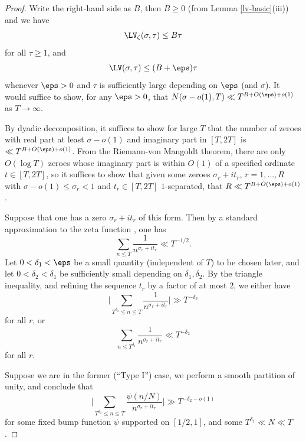 \begin{proof}
Write the right-hand side as $B$, then $B \geq 0$ (from Lemma \ref{lv-basic}(iii)) and we have
\begin{equation}\label{lvz-bound}
    \LV_\zeta(\sigma,\tau) \leq B \tau
\end{equation}
for all $\tau \geq 1$, and
\begin{equation}\label{lv-bound}
    \LV(\sigma,\tau) \leq (B+\eps) \tau
\end{equation}
whenever $\eps>0$ and $\tau$ is sufficiently large depending on $\eps$ (and $\sigma$).  It would suffice to show, for any $\eps>0$, that $N(\sigma-o(1),T) \ll T^{B+O(\eps)+o(1)}$ as $T \to \infty$.

By dyadic decomposition, it suffices to show for large $T$ that the number of zeroes with real part at least $\sigma-o(1)$ and imaginary part in  $[T,2T]$ is $\ll T^{B+O(\eps)+o(1)}$.  From the Riemann-von Mangoldt theorem, there are only $O(\log T)$ zeroes whose imaginary part is within $O(1)$ of a specified ordinate $t \in [T,2T]$, so it suffices to show that given some zeroes $\sigma_r + i t_r$, $r=1,\dots,R$ with $\sigma-o(1) \leq \sigma_r < 1$ and $t_r \in [T,2T]$ $1$-separated, that $R \ll T^{B+O(\eps)+o(1)}$.

Suppose that one has a zero $\sigma_r+i t_r$ of this form.  Then by a standard approximation to the zeta function \cite[Theorem 1.8]{ivic}, one has
$$ \sum_{n \leq T} \frac{1}{n^{\sigma_r+it_r}} \ll T^{-1/2}.$$
Let $0 < \delta_1 < \eps$ be a small quantity (independent of $T$) to be chosen later, and let $0 < \delta_2 < \delta_1$ be sufficiently small depending on $\delta_1,\delta_2$.  By the triangle inequality, and refining the sequence $t_r$ by a factor of at most $2$, we either have
$$ \bigg|\sum_{T^{\delta_1} \leq n \leq T} \frac{1}{n^{\sigma_r+it_r}} \bigg| \gg T^{-\delta_2}$$
for all $r$, or
\begin{equation}\label{td}
 \sum_{n \leq T^{\delta_1}} \frac{1}{n^{\sigma_r+it_r}} \ll T^{-\delta_2}
\end{equation}
for all $r$.

Suppose we are in the former (``Type I'') case, we perform a smooth partition of unity, and conclude that
$$ \bigg|\sum_{T^{\delta_1} \leq n \leq T} \frac{\psi(n/N)}{n^{\sigma_r+it_r}} \bigg| \gg T^{-\delta_2 - o(1)}$$
for some fixed bump function $\psi$ supported on $[1/2,1]$, and some $T^{\delta_1} \ll N \ll T$.


\end{proof}
